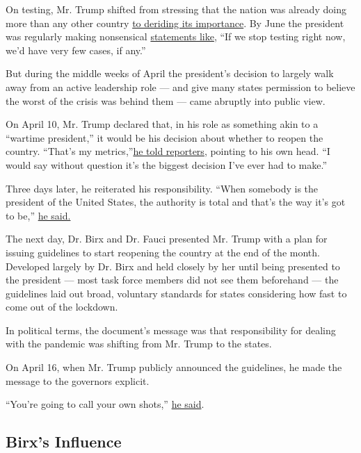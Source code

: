 On testing, Mr. Trump shifted from stressing that the nation was already
doing more than any other country
\href{https://www.politico.com/news/2020/05/14/trump-coronavirus-testing-high-case-numbers-259524}{to
deriding its importance}. By June the president was regularly making
nonsensical
\href{https://www.youtube.com/watch?v=aN1eptTaWVM}{statements like},
``If we stop testing right now, we'd have very few cases, if any.''

But during the middle weeks of April the president's decision to largely
walk away from an active leadership role --- and give many states
permission to believe the worst of the crisis was behind them --- came
abruptly into public view.

On April 10, Mr. Trump declared that, in his role as something akin to a
``wartime president,'' it would be his decision about whether to reopen
the country. ``That's my
metrics,''\href{https://www.whitehouse.gov/briefings-statements/remarks-president-trump-vice-president-pence-members-coronavirus-task-force-press-briefing-24/}{he
told reporters}, pointing to his own head. ``I would say without
question it's the biggest decision I've ever had to make.''

Three days later, he reiterated his responsibility. ``When somebody is
the president of the United States, the authority is total and that's
the way it's got to be,''
\href{https://www.whitehouse.gov/briefings-statements/remarks-president-trump-vice-president-pence-members-coronavirus-task-force-press-briefing-25/}{he
said.}

The next day, Dr. Birx and Dr. Fauci presented Mr. Trump with a plan for
issuing guidelines to start reopening the country at the end of the
month. Developed largely by Dr. Birx and held closely by her until being
presented to the president --- most task force members did not see them
beforehand --- the guidelines laid out broad, voluntary standards for
states considering how fast to come out of the lockdown.

In political terms, the document's message was that responsibility for
dealing with the pandemic was shifting from Mr. Trump to the states.

On April 16, when Mr. Trump publicly announced the guidelines, he made
the message to the governors explicit.

``You're going to call your own shots,''
\href{https://www.nytimes3xbfgragh.onion/2020/04/16/us/politics/coronavirus-trump-guidelines.html}{he
said}.

\hypertarget{birxs-influence}{%
\subsection{Birx's Influence}\label{birxs-influence}}

